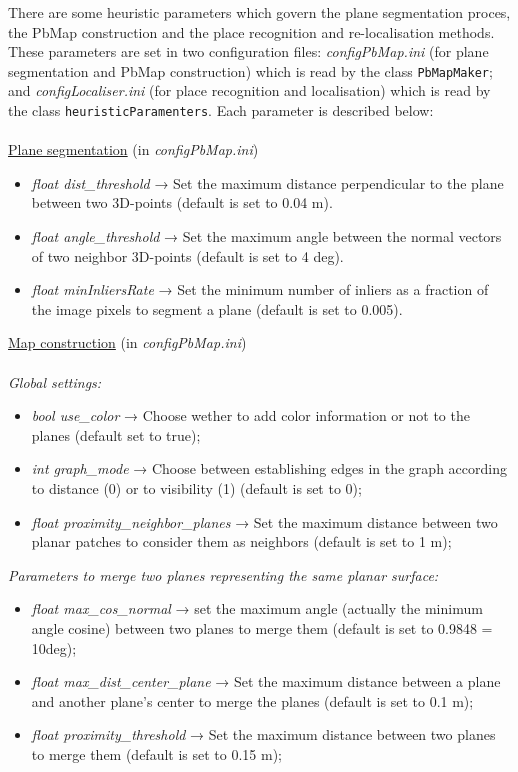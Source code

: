 \documentclass[a4paper,11pt]{article}
\begin{document}
There are some heuristic parameters which govern the plane segmentation proces, the PbMap construction and the place recognition  and re-localisation methods. These parameters are set in two configuration files: \emph{configPbMap.ini} (for plane segmentation and PbMap construction) which is read by the class \texttt{PbMapMaker}; and \emph{configLocaliser.ini} (for place recognition and localisation) which is read by the class \texttt{heuristicParamenters}. Each parameter is described below: \\
 \\
\underline{Plane segmentation} (in \emph{configPbMap.ini})
\begin{itemize}
\item \emph{float dist\_threshold} → Set the maximum distance perpendicular to the plane between two 3D-points (default is set to 0.04 m).
\item \emph{float angle\_threshold} → Set the maximum angle between the normal vectors of two neighbor 3D-points (default is set to 4 deg).
\item \emph{float minInliersRate} → Set the minimum number of inliers as a fraction of the image pixels to segment a plane (default is set to 0.005).

\end{itemize}
\underline{Map construction} (in  \emph{configPbMap.ini}) \\
\\
\emph{Global settings:}
\begin{itemize}
\item \emph{bool use\_color} → Choose wether to add color information or not to the planes (default set to true);
\item \emph{int graph\_mode} → Choose between establishing edges in the graph according to distance (0) or to visibility (1) (default is set to 0);
\item \emph{float proximity\_neighbor\_planes} → Set the maximum distance between two planar patches to consider them as neighbors (default is set to 1 m);

\end{itemize}
\emph{Parameters to merge two planes representing the same planar surface:} 
\begin{itemize}
\item \emph{float max\_cos\_normal} → set the maximum angle (actually the minimum angle cosine) between two planes to merge them (default is set to 0.9848 = 10deg);
\item \emph{float max\_dist\_center\_plane} → Set the maximum distance between a plane and another plane's center to merge the planes (default is set to 0.1 m);
\item \emph{float proximity\_threshold} → Set the maximum distance between two planes to merge them (default is set to 0.15 m); 
\end{itemize}
\end{document}
